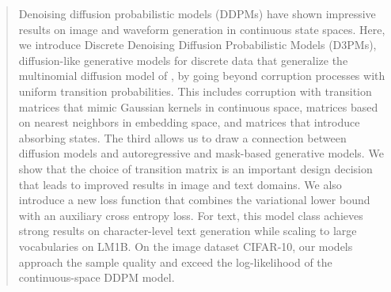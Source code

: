
\maketitle

\begin{abstract}
Denoising diffusion probabilistic models (DDPMs) \citep{ho2020denoising} have shown impressive results on image and waveform generation in continuous state spaces. Here, we introduce Discrete Denoising Diffusion Probabilistic Models (D3PMs), diffusion-like generative models for discrete data that generalize the multinomial diffusion model of \citet{hoogeboom2021argmax}, by going beyond corruption processes with uniform transition probabilities. This includes corruption with transition matrices that mimic Gaussian kernels in continuous space, matrices based on nearest neighbors in embedding space, and matrices that introduce absorbing states. The third allows us to draw a connection between diffusion models and autoregressive and mask-based generative models. We show that the choice of transition matrix is an important design decision that leads to improved results in image and text domains. We also introduce a new loss function that combines the variational lower bound with an auxiliary cross entropy loss.  For text, this model class achieves strong results on character-level text generation while scaling to large vocabularies on LM1B. On the image dataset CIFAR-10, our models approach the sample quality and exceed the log-likelihood of the continuous-space DDPM model.
\end{abstract}









    








% 


